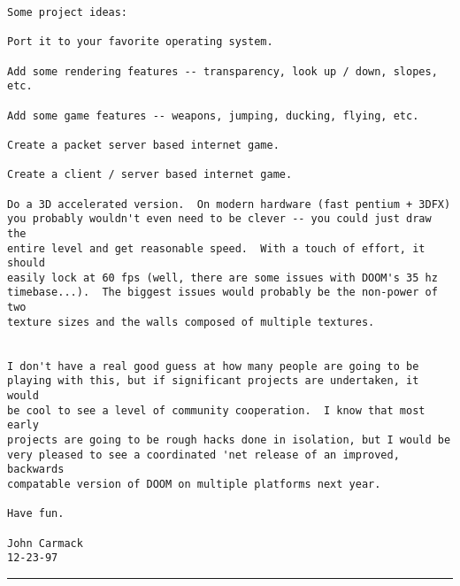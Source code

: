 \begin{verbatim}
Some project ideas:

Port it to your favorite operating system.

Add some rendering features -- transparency, look up / down, slopes,
etc.

Add some game features -- weapons, jumping, ducking, flying, etc.

Create a packet server based internet game.

Create a client / server based internet game.

Do a 3D accelerated version.  On modern hardware (fast pentium + 3DFX)
you probably wouldn't even need to be clever -- you could just draw the
entire level and get reasonable speed.  With a touch of effort, it should
easily lock at 60 fps (well, there are some issues with DOOM's 35 hz
timebase...).  The biggest issues would probably be the non-power of two
texture sizes and the walls composed of multiple textures.


I don't have a real good guess at how many people are going to be
playing with this, but if significant projects are undertaken, it would
be cool to see a level of community cooperation.  I know that most early
projects are going to be rough hacks done in isolation, but I would be
very pleased to see a coordinated 'net release of an improved, backwards
compatable version of DOOM on multiple platforms next year.

Have fun.

John Carmack
12-23-97

\end{verbatim}
\par \hrule